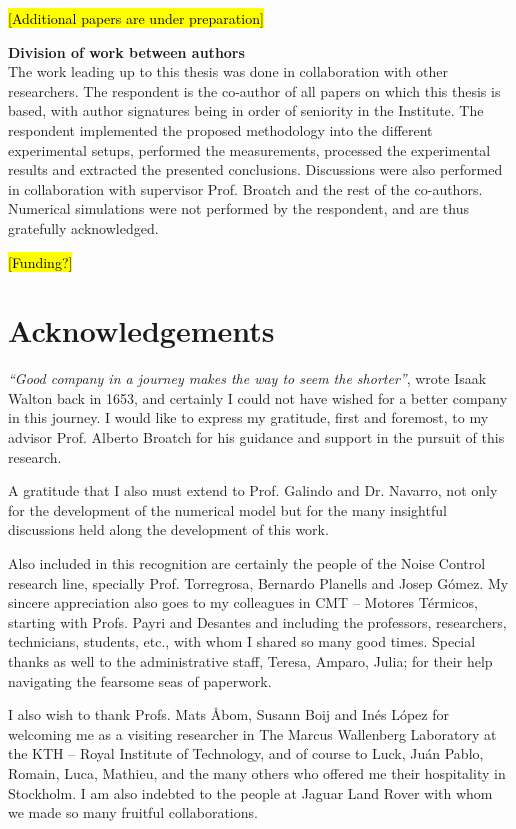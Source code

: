 \documentclass[final,twoside,11pt]{book}
\makeatletter
\numberwithin{equation}{section}
\numberwithin{figure}{chapter}
\numberwithin{table}{chapter}
\def\cleardoublepage{\clearpage\if@twoside \ifodd\c@page\else
  \hbox{}
  \thispagestyle{empty}
  \newpage
  \if@twocolumn\hbox{}\newpage\fi\fi\fi}
\makeatother
\begin{document}
\hl{[Additional papers are under preparation]}

\newpage

{\bfseries\sffamily\Large\noindent Division of work between authors}\\[-1mm]

The work leading up to this thesis was done in collaboration with other researchers. The respondent is the co-author of all papers on which this thesis is based, with author signatures being in order of seniority in the Institute. The respondent implemented the proposed methodology into the different experimental setups, performed the measurements, processed the experimental results and extracted the presented conclusions. Discussions were also performed in collaboration with supervisor Prof. Broatch and the rest of the co-authors. Numerical simulations were not performed by the respondent, and are thus gratefully acknowledged.

\hl{[Funding?]}

\cleardoublepage

\chapter*{Acknowledgements}
\enlargethispage{15mm}
\textit{``Good company in a journey makes the way to seem the shorter''}, wrote Isaak Walton back in 1653, and certainly I could not have wished for a better company in this journey. I would like to express my gratitude, first and foremost, to my advisor Prof. Alberto Broatch for his guidance and support in the pursuit of this research.

A gratitude that I also must extend to Prof. Galindo and Dr. Navarro, not only for the development of the numerical model but for the many insightful discussions held along the development of this work.

Also included in this recognition are certainly the people of the Noise Control research line, specially Prof. Torregrosa, Bernardo Planells and Josep Gómez. My sincere appreciation also goes to my colleagues in CMT -- Motores Térmicos, starting with Profs. Payri and Desantes and including the professors, researchers, technicians, students, etc., with whom I shared so many good times. Special thanks as well to the administrative staff, Teresa, Amparo, Julia; for their help navigating the fearsome seas of paperwork.

I also wish to thank Profs. Mats Åbom, Susann Boij and Inés López for welcoming me as a visiting researcher in The Marcus Wallenberg Laboratory at the KTH -- Royal Institute of Technology, and of course to Luck, Juán Pablo, Romain, Luca, Mathieu, and the many others who offered me their hospitality in Stockholm. I am also indebted to the people at Jaguar Land Rover with whom we made so many fruitful collaborations.
\end{document}
